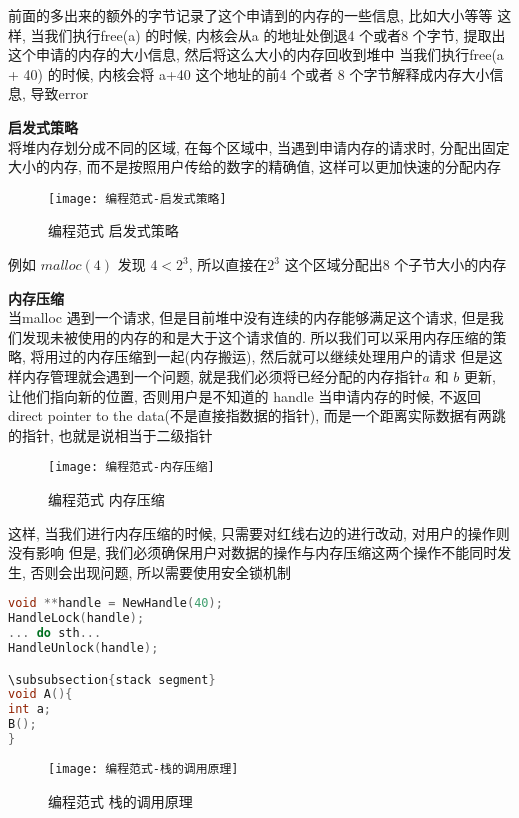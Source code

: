 \documentclass{article}
\begin{document}
前面的多出来的额外的字节记录了这个申请到的内存的一些信息, 比如大小等等
这样, 当我们执行free(a) 的时候, 内核会从a 的地址处倒退4 个或者8 个字节, 提取出这个申请的内存的大小信息, 然后将这么大小的内存回收到堆中
当我们执行free(a + 40) 的时候, 内核会将 a+40 这个地址的前4 个或者 8 个字节解释成内存大小信息, 导致error

\bigskip
\textbf{启发式策略}\\
将堆内存划分成不同的区域, 在每个区域中, 当遇到申请内存的请求时, 分配出固定大小的内存, 而不是按照用户传给的数字的精确值, 这样可以更加快速的分配内存
\begin{figure}[htbp]
	\centering
	\texttt{[image: 编程范式-启发式策略]}\\
	\caption{编程范式 启发式策略}\label{fig.编程范式.启发式策略}
\end{figure}

例如 $malloc(4)$ 发现 $4 < 2^3$, 所以直接在$2^3$ 这个区域分配出$8$ 个子节大小的内存

\textbf{内存压缩}\\
当malloc 遇到一个请求, 但是目前堆中没有连续的内存能够满足这个请求, 但是我们发现未被使用的内存的和是大于这个请求值的.
所以我们可以采用内存压缩的策略, 将用过的内存压缩到一起(内存搬运), 然后就可以继续处理用户的请求
但是这样内存管理就会遇到一个问题, 就是我们必须将已经分配的内存指针$a$ 和 $b$ 更新, 让他们指向新的位置, 否则用户是不知道的
handle
当申请内存的时候, 不返回direct pointer to the data(不是直接指数据的指针), 而是一个距离实际数据有两跳的指针, 也就是说相当于二级指针
\begin{figure}[htbp]
	\centering
	\texttt{[image: 编程范式-内存压缩]}\\
	\caption{编程范式 内存压缩}\label{fig.编程范式.内存压缩}
\end{figure}

这样, 当我们进行内存压缩的时候, 只需要对红线右边的进行改动, 对用户的操作则没有影响
但是, 我们必须确保用户对数据的操作与内存压缩这两个操作不能同时发生, 否则会出现问题, 所以需要使用安全锁机制
\begin{lstlisting}[language = C]
void **handle = NewHandle(40);
HandleLock(handle);
... do sth...
HandleUnlock(handle);

\subsubsection{stack segment}
void A(){
int a;
B();
}
\end{lstlisting}
\begin{figure}[htbp]
	\centering
	\texttt{[image: 编程范式-栈的调用原理]}\\
	\caption{编程范式 栈的调用原理}\label{fig.编程范式.栈的调用原理}
\end{figure}
\end{document}
